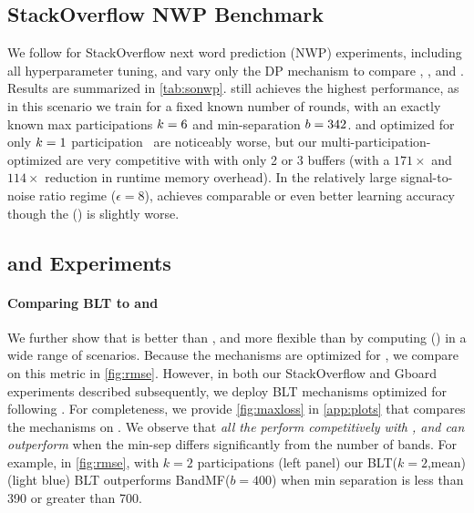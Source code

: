 \subsection{StackOverflow NWP Benchmark} \label{sec:sonwp}

We follow \citet{choquette2023amplified} for StackOverflow next word prediction (NWP) experiments, including all hyperparameter tuning, and vary only the DP mechanism to compare \bandmf, \tafull, and \blts. Results are summarized in \cref{tab:sonwp}. \bandmf still achieves the highest performance, as in this scenario we train for a fixed known number of rounds, with an exactly known max participations $k=6$ and min-separation $b=342$. \tafull and \blts optimized for only $k=1$ participation~\citep{mcmahan2024efficient} are noticeably worse, but our multi-participation-optimized \blts are very competitive with \bandmf with only 2 or 3 buffers (with a $171\times$ and $114\times$ reduction in runtime memory overhead). 
In the relatively large signal-to-noise ratio regime ($\epsilon=8$), \ourblt achieves comparable or even better learning accuracy though the \rmsloss (\maxloss) is slightly worse.


\subsection{\rmsloss and \maxloss Experiments} \label{sec:rmse_exp}

\paragraph{Comparing BLT to \tafull and \bandmf} We further show that \blt is better than {\small \tafull}, and more flexible than \bandmf by computing \rmsloss (\maxloss) in a wide range of scenarios. Because the \bandmf mechanisms are optimized for \rmsloss, we compare on this metric in \cref{fig:rmse}. However, in both our StackOverflow and Gboard experiments described subsequently, we deploy BLT mechanisms optimized for \maxerr following \citep{mcmahan2024efficient}. For completeness, we provide \cref{fig:maxloss} in \cref{app:plots} that compares the mechanisms on \maxloss. 
We observe that \emph{all the \blts perform competitively with \bandmf, and can outperform \bandmf} when the min-sep differs significantly from the number of bands. For example, in \cref{fig:rmse}, with $k=2$ participations (left panel) our BLT($k=2$,mean) (light blue) BLT outperforms BandMF($b=400$) when min separation is less than 390 or greater than 700. 

